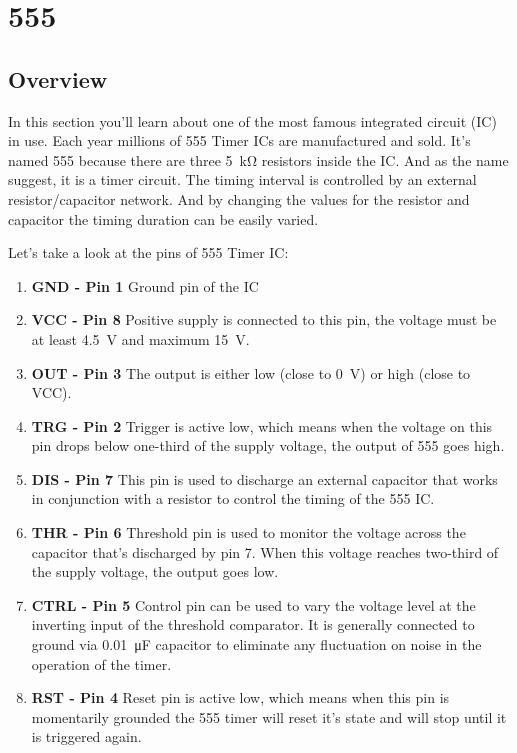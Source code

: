 \cleardoublepage
{} %

\chapter{555}

\section{Overview}
In this section you'll learn about one of the most famous integrated circuit (IC) in use. Each year millions of 555 Timer ICs are manufactured and sold.
It's named 555 because there are three \SI{5}{\kilo\ohm} resistors inside the IC. And as the name suggest, it is a timer circuit. 
The timing interval is controlled by an external resistor/capacitor network. And by changing the values for the resistor and 
capacitor the timing duration can be easily varied.

Let's take a look at the pins of 555 Timer IC:
\begin{enumerate}
    \item \textbf{GND - Pin 1} Ground pin of the IC
    \item \textbf{VCC - Pin 8} Positive supply is connected to this pin, the voltage must be at least \SI{4.5}{\volt} and maximum \SI{15}{\volt}.
    \item \textbf{OUT - Pin 3} The output is either low (close to \SI{0}{\volt}) or high (close to VCC).
    \item \textbf{TRG - Pin 2} Trigger is active low, which means when the voltage on this pin drops below one-third of the supply voltage, the output of 555 goes high.
    \item \textbf{DIS - Pin 7} This pin is used to discharge an external capacitor that works in conjunction with a resistor to control the timing of the 555 IC.
    \item \textbf{THR - Pin 6} Threshold pin is used to monitor the voltage across the capacitor that's discharged by pin 7. When this voltage reaches two-third of the supply voltage, the output goes low.
    \item \textbf{CTRL - Pin 5} Control pin can be used to vary the voltage level at the inverting input of the threshold comparator. It is generally connected to ground via \SI{0.01}{\micro\farad} capacitor to eliminate any fluctuation on noise in the operation of the timer.
    \item \textbf{RST - Pin 4} Reset pin is active low, which means when this pin is momentarily grounded the 555 timer will reset it's state and will stop until it is triggered again.
\end{enumerate}

